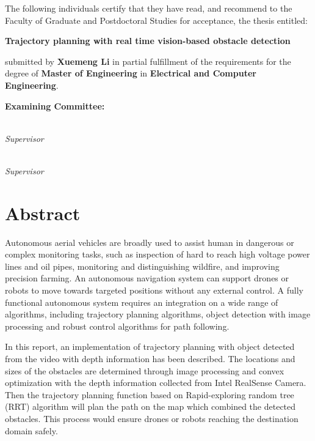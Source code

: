
\noindent The following individuals certify that they have read,
and recommend to the Faculty of Graduate and Postdoctoral Studies
for acceptance, the thesis entitled:

\begin{center}
{\large \textbf{Trajectory planning with real time vision-based obstacle detection}}
\end{center}

submitted by \textbf{Xuemeng Li} in partial fulfillment of the requirements for the degree of \textbf{Master of Engineering} in \textbf{Electrical and Computer Engineering}.%
\par\bigskip%

\noindent\textbf{Examining Committee:}%
\par\medskip{}\\\emph{Supervisor}
\par\medskip{}\\\emph{Supervisor}
\cleardoublepage

\chapter{Abstract}

Autonomous aerial vehicles are broadly used to assist human in dangerous or complex monitoring tasks, such as inspection of hard to reach high voltage power lines and oil pipes, monitoring and distinguishing wildfire, and improving precision farming. An autonomous navigation system can support drones or robots to move towards targeted positions without any external control. A fully functional autonomous system requires an integration on a wide range of algorithms, including trajectory planning algorithms, object detection with image processing and robust control algorithms for path following. 

In this report, an implementation of trajectory planning with object detected from the video with depth information has been described. The locations and sizes of the obstacles are determined through image processing and convex optimization with the depth information collected from Intel RealSense Camera. Then the trajectory planning function based on Rapid-exploring random tree (RRT) algorithm will plan the path on the map which combined the detected obstacles. This process would ensure drones or robots reaching the destination domain safely.



